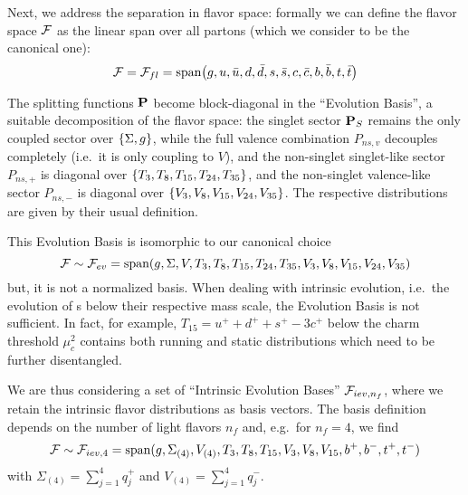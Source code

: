 Next, we address the separation in flavor space: formally we can define the
flavor space $\mathcal{F}$ as the linear span over all partons (which we consider to be
the canonical one):
\begin{equation}
    \mathcal{F} = \mathcal{F}_{fl} = \text{span}\qty(g, u, \bar u, d, \bar d, s, \bar s, c, \bar c, b, \bar b, t, \bar t)
\end{equation}

The splitting functions $\vb P$ become block-diagonal in the \enquote{Evolution
Basis}, a suitable decomposition of the flavor space: the singlet sector $\vb
P_S$ remains the only coupled sector over $\qty{\Sigma, g}$, while the full
valence combination $P_{ns,v}$ decouples completely (i.e.\ it is only coupling
to $V$), and the non-singlet singlet-like sector $P_{ns,+}$ is diagonal over
$\qty{T_3,T_8,T_{15},T_{24},T_{35}}$, and the non-singlet valence-like sector
$P_{ns,-}$ is diagonal over $\qty{V_3,V_8,V_{15},V_{24},V_{35}}$.
The respective distributions are given by their usual definition.

This Evolution Basis is isomorphic to our canonical choice
\begin{equation}
    \mathcal{F} \sim \mathcal{F}_{ev} = \text{span}(g, \Sigma, V, T_{3}, T_{8}, T_{15}, T_{24}, T_{35}, V_{3}, V_{8}, V_{15}, V_{24}, V_{35})
\end{equation}
but, it is not a normalized basis. When dealing with intrinsic evolution, i.e.\
the evolution of \pdf{}s below their respective mass scale, the Evolution Basis
is not sufficient. In fact, for example, $T_{15} = u^{+} + d^{+} +
s^{+} - 3c^{+}$ below the charm threshold $\mu_c^2$ contains both running and static
distributions which need to be further disentangled.

We are thus considering a set of \enquote{Intrinsic Evolution Bases} $\mathcal{F}_{iev,
n_f}$, where we retain the intrinsic flavor distributions as basis vectors.
The basis definition depends on the number of light flavors $n_f$ and, e.g.\
for $n_f=4$, we find
\begin{equation}
    \mathcal{F} \sim \mathcal{F}_{iev,4} = \text{span}(g, \Sigma_{(4)}, V_{(4)}, T_{3}, T_{8}, T_{15}, V_{3}, V_{8}, V_{15}, b^+, b^-, t^+, t^-)
\end{equation}
with $\Sigma_{(4)} = \sum\limits_{j=1}^4 q_j^+$ and $V_{(4)} =
\sum\limits_{j=1}^4 q_j^-$.
